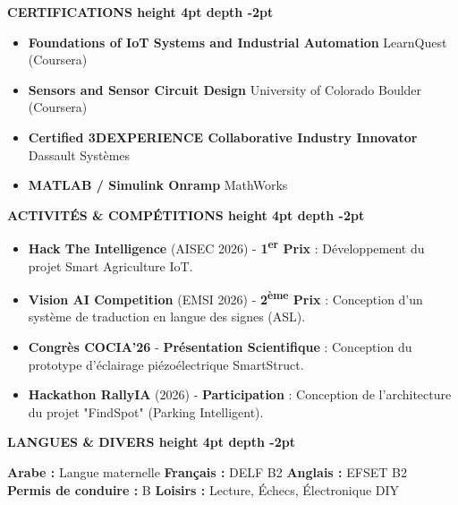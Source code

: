 \documentclass[10pt,a4paper]{altacv}
\renewcommand{\cvsection}[2][]{%
  \vspace{3pt}%
  {\color{heading}\LARGE\bfseries #2 \hspace{0.2em}\leaders\vrule height 4pt depth -2pt\hfill\mbox{}}\par\vspace{2pt}
}
\begin{document}
\cvsection{CERTIFICATIONS}
\begin{itemize}[leftmargin=*, label=\textbullet, itemsep=2pt]
  \item \textbf{Foundations of IoT Systems and Industrial Automation} \hfill {\color{emphasis}LearnQuest (Coursera)}
  \item \textbf{Sensors and Sensor Circuit Design} \hfill {\color{emphasis}University of Colorado Boulder (Coursera)}
  \item \textbf{Certified 3DEXPERIENCE Collaborative Industry Innovator} \hfill {\color{emphasis}Dassault Systèmes}
  \item \textbf{MATLAB / Simulink Onramp} \hfill {\color{emphasis}MathWorks}
\end{itemize}

\cvsection{ACTIVITÉS \& COMPÉTITIONS}
\begin{itemize}[leftmargin=*, label=\textbullet, itemsep=2pt]
  \item \textbf{Hack The Intelligence} (AISEC 2026) - \textbf{1\textsuperscript{er} Prix} : {\small Développement du projet Smart Agriculture IoT.}
  \item \textbf{Vision AI Competition} (EMSI 2026) - \textbf{2\textsuperscript{ème} Prix} : {\small Conception d'un système de traduction en langue des signes (ASL).}
  \item \textbf{Congrès COCIA'26} - \textbf{Présentation Scientifique} : {\small Conception du prototype d'éclairage piézoélectrique SmartStruct.}
  \item \textbf{Hackathon RallyIA} (2026) - \textbf{Participation} : {\small Conception de l'architecture du projet "FindSpot" (Parking Intelligent).}
\end{itemize}


\cvsection{LANGUES \& DIVERS}
\textbf{Arabe :} Langue maternelle \hfill \textbf{Français :} DELF B2 \hfill \textbf{Anglais :} EFSET B2\\[2pt]
\textbf{Permis de conduire :} B \hfill \textbf{Loisirs :} Lecture, Échecs, Électronique DIY
\end{document}
